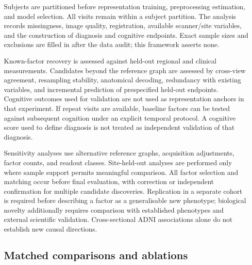 \documentclass[10pt,twocolumn,letterpaper]{article}
\begin{document}
Subjects are partitioned before representation training, preprocessing estimation, and model selection. All visits remain within a subject partition. The analysis records missingness, image quality, registration, available scanner/site variables, and the construction of diagnosis and cognitive endpoints. Exact sample sizes and exclusions are filled in after the data audit; this framework asserts none.

Known-factor recovery is assessed against held-out regional and clinical measurements. Candidates beyond the reference graph are assessed by cross-view agreement, resampling stability, anatomical decoding, redundancy with existing variables, and incremental prediction of prespecified held-out endpoints. Cognitive outcomes used for validation are not used as representation anchors in that experiment. If repeat visits are available, baseline factors can be tested against subsequent cognition under an explicit temporal protocol. A cognitive score used to define diagnosis is not treated as independent validation of that diagnosis.

Sensitivity analyses use alternative reference graphs, acquisition adjustments, factor counts, and readout classes. Site-held-out analyses are performed only where sample support permits meaningful comparison. All factor selection and matching occur before final evaluation, with correction or independent confirmation for multiple candidate discoveries. Replication in a separate cohort is required before describing a factor as a generalisable new phenotype; biological novelty additionally requires comparison with established phenotypes and external scientific validation. Cross-sectional ADNI associations alone do not establish new causal directions.

\subsection{Matched comparisons and ablations}
\end{document}
